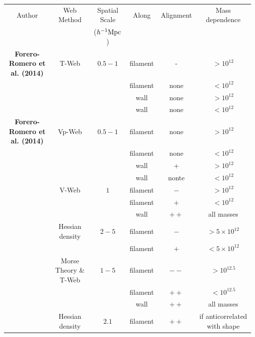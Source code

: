 \documentclass[useAMS,usenatbib]{mn2e}
\newcommand{\hMpc}{{\ifmmode{h^{-1}{\rm Mpc}}\else{$h^{-1}$Mpc }\fi}}
\newcommand{\hMsun}{{\ifmmode{h^{-1}{\rm
        {M_{\odot}}}}\else{$h^{-1}{\rm{M_{\odot}}}$~}\fi}}
\begin{document}
\begin{table}
\begin{tabular}{cccccc}\hline\hline
Author & Web Method & Spatial Scale& Along &
Alignment & Mass dependence\\
 & & ($\hMpc$)& & & \\\hline

{\bf Forero-Romero et al. (2014)} & T-Web & $0.5-1$ &
filament & - & $>10^{12}$\hMsun\\

&   & &
filament & none & $<10^{12}$\hMsun\\

&   & &
wall & none & $>10^{12}$\hMsun\\

&   & &
wall & none & $<10^{12}$\hMsun\\\hline

{\bf Forero-Romero et al. (2014)} & Vp-Web & $0.5-1$ &
filament &none & $>10^{12}$\hMsun\\

&   & &
filament & none & $<10^{12}$\hMsun\\

&   & &
wall & + & $>10^{12}$\hMsun\\

&   & &
wall & nonte & $<10^{12}$\hMsun\\\hline

\cite{Libeskind2013} & V-Web & $1$ &
filament &$-$ & $>10^{12}$\hMsun\\

&   & &
filament &$+$ & $<10^{12}$\hMsun\\

&   & &
wall & $++$ & all masses\\\hline

\cite{Trowland2013} & Hessian density & $2-5$ &
filament & $-$ & $> 5\times 10^{12}$\hMsun\\
&   & &
filament & $+$ & $< 5\times 10^{12}$\hMsun\\\hline

\cite{Codis2012} & Morse Theory \& T-Web & $1-5$ &
filament & $--$ & $>10^{12.5}$\hMsun \\

&   & &
filament & $++$ & $<10^{12.5}$\hMsun \\

& & &
wall & $++$ & all masses\\\hline

\cite{Zhang2009}  & Hessian density &  $2.1$ &
filament & $++$ & if anticorrelated with shape\\


\end{tabular}
\end{table}
\end{document}
